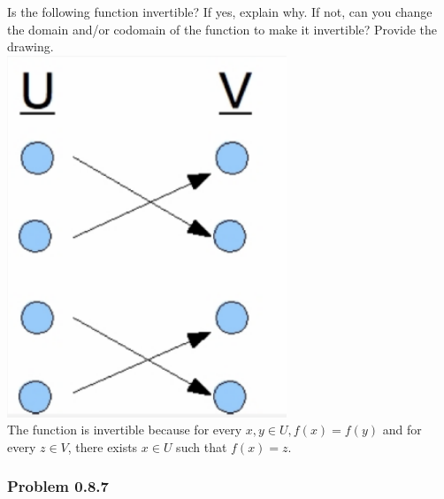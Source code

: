 \documentclass[
  letterpaper,
  DIV=11,
  numbers=noendperiod]{scrartcl}
\begin{document}
Is the following function invertible? If yes, explain why. If not, can
you change the domain and/or codomain of the function to make it
invertible? Provide the drawing.\\
\includegraphics{images/image-1442319506.png}\\
The function is invertible because for every \(x, y \in U, f(x) = f(y)\)
and for every \(z \in V\), there exists \(x \in U\) such that
\(f(x) = z\).

\hypertarget{problem-0.8.7}{%
\subsubsection{Problem 0.8.7}\label{problem-0.8.7}}
\end{document}
